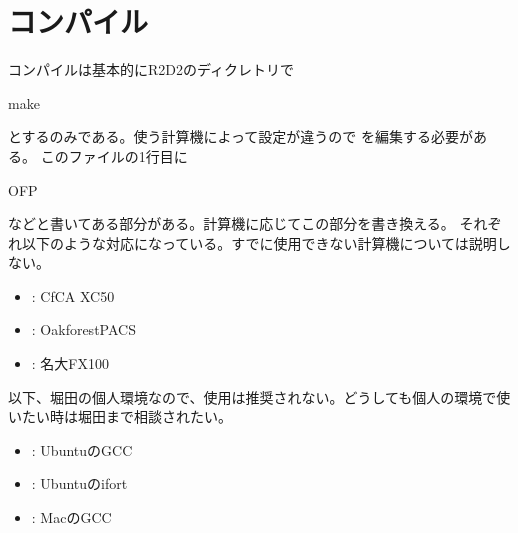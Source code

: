 \documentclass[letterpaper,10pt,dvipdfmx,report]{sphinxmanual}
\begin{document}
\begin{itemize}
\begin{description}
\begin{itemize}
\begin{description}
\begin{itemize}
\begin{description}
\end{description}

\end{itemize}

\end{description}

\end{itemize}

\end{description}

\end{itemize}


\section{コンパイル}
\label{\detokenize{start:id2}}
コンパイルは基本的にR2D2のディクレトリで

\begin{sphinxVerbatim}[commandchars=\\\{\}]
make
\end{sphinxVerbatim}

とするのみである。使う計算機によって設定が違うので  を編集する必要がある。
このファイルの1行目に

\begin{sphinxVerbatim}[commandchars=\\\{\}]
OFP
\end{sphinxVerbatim}

などと書いてある部分がある。計算機に応じてこの部分を書き換える。
それぞれ以下のような対応になっている。すでに使用できない計算機については説明しない。
\begin{itemize}
\item {} 
: CfCA XC50

\item {} 
: Oakforest\sphinxhyphen{}PACS

\item {} 
: 名大FX100

\end{itemize}

以下、堀田の個人環境なので、使用は推奨されない。どうしても個人の環境で使いたい時は堀田まで相談されたい。
\begin{itemize}
\item {} 
: UbuntuのGCC

\item {} 
: Ubuntuのifort

\item {} 
: MacのGCC

\end{itemize}
\end{document}
